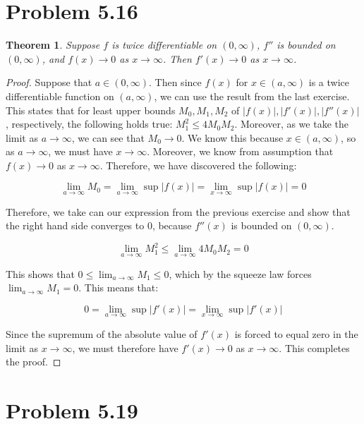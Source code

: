 \documentclass[psamsfonts]{amsart}
\newtheorem{thm}{Theorem}[section]
\theoremstyle{definition}
\theoremstyle{remark}
\numberwithin{equation}{section}
\begin{document}
\section{Problem 5.16}

\begin{thm}
Suppose $f$ is twice differentiable on $(0,\infty)$, $f''$ is bounded on $(0,\infty)$, and $f(x) \to 0$ as $x \to \infty$. Then $f'(x) \to 0$ as $x \to \infty$. 
\end{thm}

\begin{proof}
Suppose that $a \in (0,\infty)$. Then since $f(x)$ for $x \in (a,\infty)$ is a twice differentiable function on $(a,\infty)$, we can use the result from the last exercise. This states that for least upper bounds $M_0, M_1, M_2$ of $|f(x)|,|f'(x)|,|f''(x)|$, respectively, the following holds true: $M_1^2 \leq 4 M_0 M_2$. Moreover, as we take the limit as $a \to \infty$, we can see that $M_0 \to 0$. We know this because $x \in (a, \infty)$, so as $a \to \infty$, we must have $x \to \infty$. Moreover, we know from assumption that $f(x) \to 0$ as $x \to \infty$. Therefore, we have discovered the following:

\begin{equation}
\lim_{a \to \infty} M_0 = \lim_{a \to \infty} \sup | f(x) | = \lim_{x \to \infty} \sup |f(x)| = 0 
\end{equation}

Therefore, we take can our expression from the previous exercise and show that the right hand side converges to 0, because $f''(x)$ is bounded on $(0, \infty)$.

\begin{equation}
\lim_{a \to \infty} M_1^2 \leq \lim_{a \to \infty} 4 M_0 M_2 = 0
\end{equation}

This shows that $0 \leq \lim_{a \to \infty} M_1 \leq 0$, which by the squeeze law forces $\lim_{a \to \infty} M_1 = 0$. This means that:

\begin{equation}
0 = \lim_{a \to \infty} \sup|f'(x)| = \lim_{x \to \infty} \sup |f'(x)| 
\end{equation}

Since the supremum of the absolute value of $f'(x)$ is forced to equal zero in the limit as $x \to \infty$, we must therefore have $f'(x) \to 0$ as $x \to \infty$. This completes the proof.
\end{proof}


\section{Problem 5.19}
\end{document}
